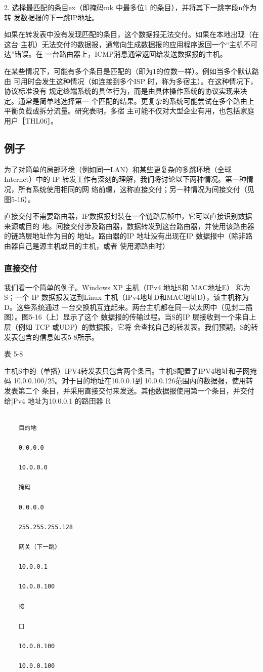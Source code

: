 2. 选择最匹配的条目ex（即掩码mk 中最多位1 的条目），并将其下一跳字段n作为转
发数据报的下一跳IP地址。

如果在转发表中没有发现匹配的条目，这个数据报无法交付。如果在本地出现（在这台
主机）无法交付的数据报，通常向生成数据报的应用程序返回一个“主机不可达”错误。在
一台路由器上，ICMP消息通常返回给发送数据报的主机。

在某些情况下，可能有多个条目是匹配的（即为1的位数一样）。例如当多个默认路由
可用时会发生这种情况（如连接到多个ISP 时，称为多宿主）。在这种情况下，协议标准没有
规定终端系统的具体行为，而是由具体操作系统的协议实现来决定。通常是简单地选择第一
个匹配的结果。更复杂的系统可能尝试在多个路由上平衡负载或拆分流量。研究表明，多宿
主可能不仅对大型企业有用，也包括家庭用户［THL06］。

\subsection{例子}

为了对简单的局部环境（例如同一LAN）和某些更复杂的多跳环境（全球 Internet）中的
IP 转发工作有深刻的理解，我们将讨论以下两种情况。第一种情况，所有系统使用相同的网
络前缀，这称直接交付；另一种情况为间接交付（见图5-16）。

直接交付不需要路由器，IP数据报封装在一个链路层帧中，它可以直接识别数据来源或目的
地。间接交付涉及路由器，数据转发到这台路由器，并使用该路由器的链路层地址作为目的
地址。路由器的IP 地址没有出现在IP 数据报中（除非路由器自己是源主机或目的主机，或者
使用源路由时）

\subsubsection{直接交付}
我们看一个简单的例子。Windows XP 主机（IPv4 地址S和 MAC地址E） 称为S；一个
IP 数据报发送到Linux 主机（IPv4地址D和MAC地址D），该主机称为D。这些系统通过
一台交换机互连起来。两台主机都在同一以太网中（见封二插图）。图5-16（上）显示了这个
数据报的传输过程。当S的IP 层接收到一个来自上层（例如 TCP 或UDP）的数据报，它将
会查找自己的转发表。我们预期，S的转发表包含的信息如表5-8所示。

表 5-8

主机S中的（单播）IPV4转发表只包含两个条目。主机S配置了IPV4地址和子网掩码
10.0.0.100/25。对于目的地址在10.0.0.1到 10.0.0.126范围内的数据报，使用转发表第二个
条目，并采用直接交付来发送。其他数据报使用第一个条目，并交付给|Pv4 地址为10.0.0.1
的路田器 R
\begin{verbatim}
    
    目的地
    
    0.0.0.0
    
    10.0.0.0
    
    掩码
    
    0.0.0.0
    
    255.255.255.128
    
    网关（下一跳）
    
    10.0.0.1
    
    10.0.0.100
    
    接
    
    口
    
    10.0.0.100
    
    10.0.0.100
\end{verbatim}

